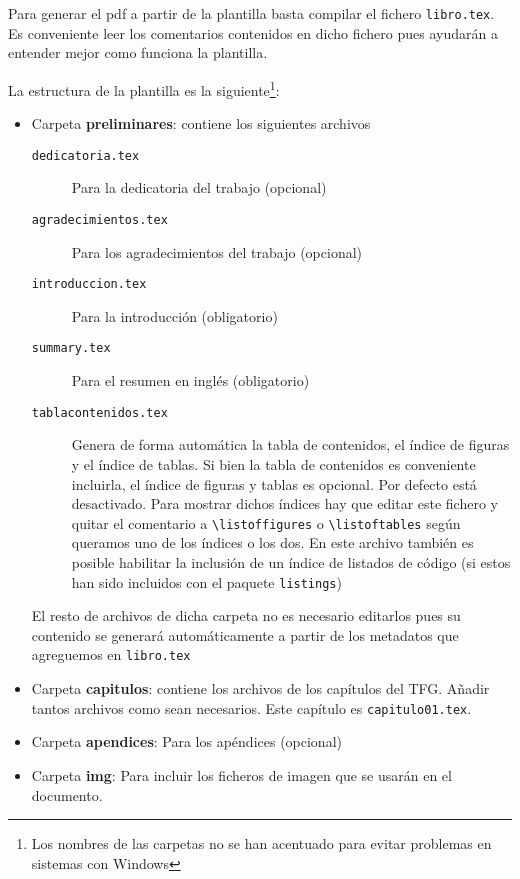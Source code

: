 Para generar el pdf a partir de la plantilla basta compilar el fichero \texttt{libro.tex}. Es conveniente leer los comentarios contenidos en dicho fichero pues ayudarán a entender mejor como funciona la plantilla. 

La estructura de la plantilla es la siguiente\footnote{Los nombres de las carpetas no se han acentuado para evitar problemas en sistemas con Windows}: 
\begin{itemize}
  \item Carpeta \textbf{preliminares}: contiene los siguientes archivos
    \begin{description}
      \item[\texttt{dedicatoria.tex}] Para la dedicatoria del trabajo (opcional)
      \item[\texttt{agradecimientos.tex}] Para los agradecimientos del trabajo (opcional)
      \item[\texttt{introduccion.tex}] Para la introducción (obligatorio)
      \item[\texttt{summary.tex}] Para el resumen en inglés (obligatorio)
      \item[\texttt{tablacontenidos.tex}] Genera de forma automática la tabla de contenidos, el índice de figuras y el índice de tablas. Si bien la tabla de contenidos es conveniente incluirla, el índice de figuras y tablas es opcional. Por defecto está desactivado. Para mostrar dichos índices hay que editar este fichero y quitar el comentario a \verb+\listoffigures+ o \verb+\listoftables+ según queramos uno de los índices o los dos. En este archivo también es posible habilitar la inclusión de un índice de listados de código (si estos han sido incluidos con el paquete \texttt{listings})
  \end{description}
  El resto de archivos de dicha carpeta no es necesario editarlos pues su contenido se generará automáticamente a partir de los metadatos que agreguemos en \texttt{libro.tex}

  \item Carpeta \textbf{capitulos}: contiene los archivos de los capítulos del TFG. Añadir tantos archivos como sean necesarios. Este capítulo es \texttt{capitulo01.tex}.

  \item Carpeta \textbf{apendices}: Para los apéndices (opcional)
  \item Carpeta \textbf{img}: Para incluir los ficheros de imagen que se usarán en el documento.
    

\end{itemize}
